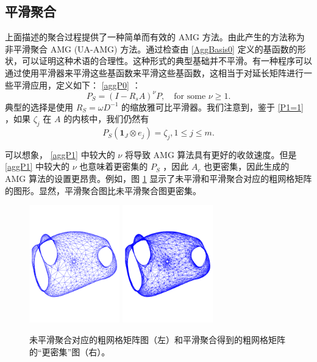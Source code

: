 \documentclass[12pt]{acta_2011xz}
\begin{document}
   \subsection{平滑聚合  }       \label{s:sa}    上面描述的聚合过程提供了一种简单而有效的 AMG 方法。由此产生的方法称为非平滑聚合 AMG (UA-AMG) 方法。通过检查由
   \eqref{AggBasis0}    定义的基函数的形状，可以证明这种术语的合理性。这种形式的典型基础并不平滑。有一种程序可以通过使用平滑器来平滑这些基函数来平滑这些基函数，这相当于对延长矩阵进行一些平滑应用，定义如下：
   \eqref{aggP0}    ：
   \begin{equation}
\label{aggP1}
P_S=(I-R_sA)^\nu P, \quad \mbox{for some } \nu\ge 1.   
\end{equation}    典型的选择是使用    $R_S=\omega
D^{-1}$    的缩放雅可比平滑器。我们注意到，鉴于    \eqref{P1=1}    ，如果    $\zeta_j$    在    $A$    的内核中，我们仍然有
   $$
P_S (\boldsymbol{1}_{J}\otimes e_j )=\zeta_j, 1\le j\le m.   
$$     

可以想象，   \eqref{aggP1}    中较大的    $\nu$    将导致 AMG 算法具有更好的收敛速度。但是    \eqref{aggP1}    中较大的    $\nu$    也意味着更密集的    $P_S$    ，因此    $A_c$    也更密集，因此生成的 AMG 算法的设置更昂贵。例如，图    \ref{fig:unsmoothed-unsmoothed}    显示了未平滑和平滑聚合对应的粗网格矩阵的图形。显然，平滑聚合图比未平滑聚合图更密集。
   \begin{figure}[!htpb]
\begin{center}
\includegraphics*[width=0.35\textwidth]{all_SA_plots3}\hspace{0.2\textwidth}
\includegraphics*[width=0.35\textwidth]{all_SA_plots4}
\end{center}
\caption{未平滑聚合对应的粗网格矩阵图（左）和平滑聚合得到的粗网格矩阵的“更密集”图（右）。
   \label{fig:unsmoothed-unsmoothed}     }
\end{figure}     
\end{document}
